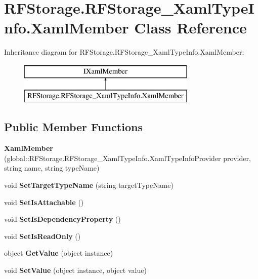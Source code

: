 \section{R\+F\+Storage.\+R\+F\+Storage\+\_\+\+Xaml\+Type\+Info.\+Xaml\+Member Class Reference}
\label{class_r_f_storage_1_1_r_f_storage___xaml_type_info_1_1_xaml_member}
Inheritance diagram for R\+F\+Storage.\+R\+F\+Storage\+\_\+\+Xaml\+Type\+Info.\+Xaml\+Member\+:\begin{figure}[H]
\begin{center}
\leavevmode
\includegraphics[height=2.000000cm]{class_r_f_storage_1_1_r_f_storage___xaml_type_info_1_1_xaml_member}
\end{center}
\end{figure}
\subsection*{Public Member Functions}
\begin{DoxyCompactItemize}
\item 
\mbox{\label{class_r_f_storage_1_1_r_f_storage___xaml_type_info_1_1_xaml_member_a26201e0a120de69a575ecf8fe8bb0f85}} 
{\bfseries Xaml\+Member} (global\+::\+R\+F\+Storage.\+R\+F\+Storage\+\_\+\+Xaml\+Type\+Info.\+Xaml\+Type\+Info\+Provider provider, string name, string type\+Name)
\item 
\mbox{\label{class_r_f_storage_1_1_r_f_storage___xaml_type_info_1_1_xaml_member_a18486fd86fb2632112b66726448929ee}} 
void {\bfseries Set\+Target\+Type\+Name} (string target\+Type\+Name)
\item 
\mbox{\label{class_r_f_storage_1_1_r_f_storage___xaml_type_info_1_1_xaml_member_ae9ca78742a9519ca0f82d645927e87ed}} 
void {\bfseries Set\+Is\+Attachable} ()
\item 
\mbox{\label{class_r_f_storage_1_1_r_f_storage___xaml_type_info_1_1_xaml_member_a46d590e3fea924a44b261e153ab4efb0}} 
void {\bfseries Set\+Is\+Dependency\+Property} ()
\item 
\mbox{\label{class_r_f_storage_1_1_r_f_storage___xaml_type_info_1_1_xaml_member_ae4abdb0d9aaf1c97c08da7c6e0863a03}} 
void {\bfseries Set\+Is\+Read\+Only} ()
\item 
\mbox{\label{class_r_f_storage_1_1_r_f_storage___xaml_type_info_1_1_xaml_member_a8e9ff39ec294c5ca665c7dab2adc6b55}} 
object {\bfseries Get\+Value} (object instance)
\item 
\mbox{\label{class_r_f_storage_1_1_r_f_storage___xaml_type_info_1_1_xaml_member_a3560e03ec2542eb1281f63661beeda1e}} 
void {\bfseries Set\+Value} (object instance, object value)
\end{DoxyCompactItemize}
